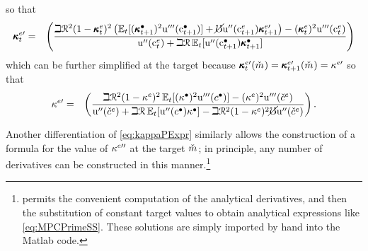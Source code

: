 \documentclass{handout}
\begin{document}
so that
\begin{eqnarray}
\pmb{\kappa}^{e\prime}_{t}   & = & \left(\frac{\beth \mathcal{R}^{2} (1-\pmb{\kappa}^{e}_{t})^{2} \left( \operatorname{\mathbb{E}}_{t}[(\pmb{\kappa}_{t+1}^{\bullet})^{2}{\mathrm{u}^{\prime\prime\prime}}(\mathrm{c}^{\bullet}_{t+1})] +\cancel{\mho} {\mathrm{u}^{\prime\prime}}(\mathrm{c}^{e}_{t+1}) \pmb{\kappa}^{e \prime}_{t+1}\right)-(\pmb{\kappa}^{e}_{t})^{2} {\mathrm{u}^{\prime\prime\prime}}(\mathrm{c}^{e}_{t})}{{\mathrm{u}^{\prime\prime}}(\mathrm{c}^{e}_{t})+\beth \mathcal{R} \operatorname{\mathbb{E}}_{t}[{\mathrm{u}^{\prime\prime}}(\mathrm{c}^{\bullet}_{t+1})\pmb{\kappa}^{\bullet}_{t+1}]  }\right) \nonumber \\ \label{eq:kappaPReverse}
\end{eqnarray}
which can be further simplified at the target because $\MPCFunc^{e \prime}_{t}(\mTarg^{\null}) = \MPCFunc^{e \prime}_{t+1}(\mTarg^{\null}) = \MPC^{e \prime}$ so that
\begin{eqnarray}
\kappa^{e\prime} & = & \left(\frac{\beth \mathcal{R}^{2} (1-\kappa^{e})^{2}\operatorname{\mathbb{E}}_{t}[(\kappa^{\bullet})^{2} {\mathrm{u}^{\prime\prime\prime}}(c^{\bullet})] -(\kappa^{e})^{2} {\mathrm{u}^{\prime\prime\prime}}(\check{c}^{e})}{{\mathrm{u}^{\prime\prime}}(\check{c}^{e}) + \beth \mathcal{R} \operatorname{\mathbb{E}}_{t}[{\mathrm{u}^{\prime\prime}}(c^{\bullet})\kappa^{\bullet}]- \beth \mathcal{R}^{2} (1-\kappa^{e})^{2}\cancel{\mho} {\mathrm{u}^{\prime\prime}}(\check{c}^{e})}\right) \label{eq:MPCPrimeSS}
.
\end{eqnarray}

Another differentiation of \eqref{eq:kappaPExpr} similarly allows the construction of a formula for the value of $\kappa^{e \prime\prime}$ at the target $\mTarg^{\null}$; in principle, any number of derivatives can be 
constructed in this manner.\footnote{\Mma permits the convenient computation of the analytical derivatives, and then the substitution of constant target values to obtain analytical expressions like \eqref{eq:MPCPrimeSS}.  These solutions are simply imported by hand into the Matlab code.}
\end{document}
